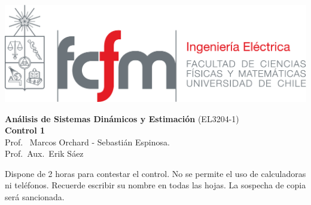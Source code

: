 \documentclass[
  11pt,
  letterpaper,
   addpoints,
   answers
  ]{exam}
\begin{document}
\noindent
\begin{minipage}{0.47\textwidth}
\includegraphics[width=\textwidth]{../fcfm_die}
\end{minipage}
\begin{minipage}{0.53\textwidth}
\begin{center} 
\large\textbf{Análisis de Sistemas Dinámicos y Estimación} (EL3204-1) \\
\large\textbf{Control 1} \\
\normalsize Prof.~ Marcos Orchard - Sebastián Espinosa.\\
\normalsize Prof.~Aux.~Erik Sáez
\end{center}
\end{minipage}

\begin{tcolorbox}[colback=yellow!10!white,colframe=black!80!white,title=Instrucciones]
Dispone de 2 horas para contestar el control. No se permite el uso de calculadoras ni teléfonos. Recuerde escribir su nombre en todas las hojas. La sospecha de copia será sancionada.
\end{tcolorbox}
\end{document}
